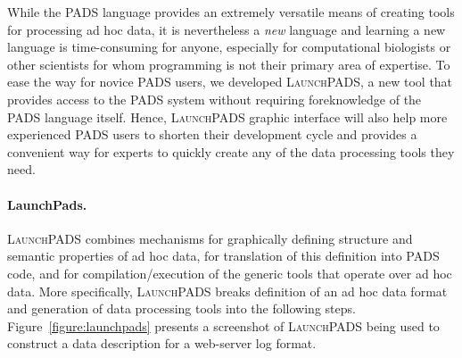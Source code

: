 \documentclass[nocopyrightspace]{sigplanconf}
\begin{document}
While the \textsc{PADS} language provides an extremely versatile means
of creating tools for processing ad hoc data, it is nevertheless a
\textit{new} language and learning a new language is time-consuming
for anyone, especially for computational biologists or 
other scientists for whom programming is not their primary
area of expertise.  To ease the way for novice 
\textsc{PADS} users, we developed \textsc{LaunchPADS},
a new tool that provides access to the PADS system
without requiring foreknowledge of the \textsc{PADS} language itself.
Hence, \textsc{LaunchPADS} graphic interface will also help more
experienced \textsc{PADS} users to shorten their development cycle
and provides a convenient way for experts to quickly create
any of the data processing tools they need.

\paragraph*{LaunchPads.}  \textsc{LaunchPADS} combines mechanisms 
for graphically defining structure and semantic properties of ad hoc data,
for translation of this definition into
\textsc{PADS} code, and for compilation/execution of the generic tools
that operate over ad hoc data.  
More specifically, \textsc{LaunchPADS} breaks definition of an 
ad hoc data format and generation of data processing tools
into the following steps.  Figure~\ref{figure:launchpads}
presents a screenshot of \textsc{LaunchPADS} being used to construct
a data description for a web-server log format.
\end{document}
